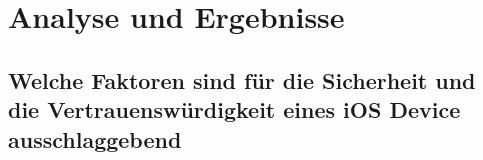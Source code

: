 %
%
%
% 


\chapter{Analyse und Ergebnisse}
\label{ch:Ergebnisse}


\section{Welche Faktoren sind für die Sicherheit und die Vertrauenswürdigkeit eines iOS Device ausschlaggebend}
\label{sec:Frage1}

